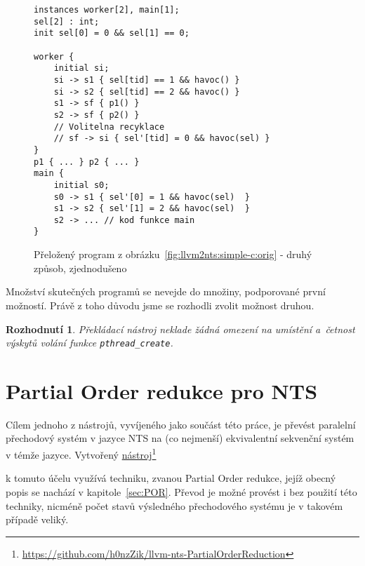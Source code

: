 \documentclass[12pt]{fithesis2}
\newtheorem{decision}  {Rozhodnutí}
\newcommand\fnurl[2]{%
  \href{#2}{#1}\footnote{\url{#2}}%
}
\begin{document}
\begin{figure}[t]
\begin{lstlisting}
instances worker[2], main[1];
sel[2] : int;
init sel[0] = 0 && sel[1] == 0;

worker {
	initial si;
	si -> s1 { sel[tid] == 1 && havoc() }
	si -> s2 { sel[tid] == 2 && havoc() }
	s1 -> sf { p1() }
	s2 -> sf { p2() }
	// Volitelna recyklace
	// sf -> si { sel'[tid] = 0 && havoc(sel) }
}
p1 { ... } p2 { ... }
main {
	initial s0;
	s0 -> s1 { sel'[0] = 1 && havoc(sel)  }
	s1 -> s2 { sel'[1] = 2 && havoc(sel)  }
	s2 -> ... // kod funkce main
}
\end{lstlisting}
\caption{Přeložený program z obrázku~\ref{fig:llvm2nts:simple-c:orig} - druhý způsob, zjednodušeno}
\label{fig:llvm2nts:simple-c:realworld-nts}
\end{figure}

Množství skutečných programů se nevejde do množiny, podporované první možností. Právě z toho důvodu jsme se rozhodli zvolit možnost druhou.

\begin{decision}\label{decision:real-world-programs}
Překládací nástroj neklade žádná omezení na umístění a~četnost výskytů volání funkce \texttt{pthread\_create}.
\end{decision}





\chapter{Partial Order redukce pro NTS}
\label{sec:nts-por}
Cílem jednoho z nástrojů, vyvíjeného jako součást této práce, je převést paralelní přechodový systém v jazyce NTS na (co nejmenší) ekvivalentní sekvenční systém v témže jazyce. Vytvořený
\fnurl{nástroj}{https://github.com/h0nzZik/llvm-nts-PartialOrderReduction}
k tomuto účelu využívá techniku, zvanou Partial Order redukce, jejíž obecný popis se nachází v kapitole~\ref{sec:POR}. Převod je možné provést i bez použití této techniky, nicméně počet stavů výsledného přechodového systému je v takovém případě veliký.
\end{document}

